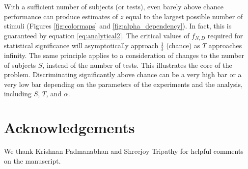 \documentclass[letterpaper,twocolumn,10pt]{article}
\begin{document}
With a sufficient number of subjects (or tests), 
even barely above chance performance can produce estimates of $z$ equal to the largest possible number of stimuli (Figures \ref{fig:colormaps} and \ref{fig:alpha_dependency}).  
In fact, this is guaranteed by equation \ref{eq:analytical2}.  
The critical values of $f_{N,D}$ required for statistical significance will asymptotically approach $\frac{1}{3}$ (chance)
as $T$ approaches infinity.  
The same principle applies to a consideration of changes to the number of subjects $S$, 
instead of the number of tests.  
This illustrates the core of the problem.  
Discriminating significantly above chance can be a very high bar or a very low bar 
depending on the parameters of the experiments and the analysis, including $S$, $T$, and $\alpha$.  

\section{Acknowledgements}
We thank Krishnan Padmanabhan and Shreejoy Tripathy for helpful comments on the manuscript.

{\footnotesize 
}
\end{document}
